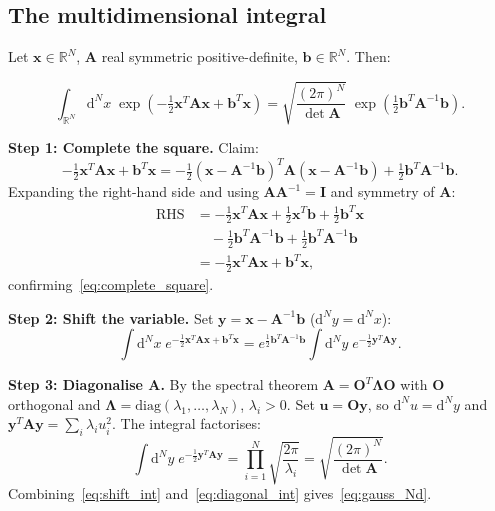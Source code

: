 \documentclass[justified,notoc]{tufte-handout}
\def\d{\mathrm{d}}
\renewcommand{\vec}[1]{\mathbf{#1}}
\begin{document}
\subsection{The multidimensional integral}

Let $\vec{x}\in\mathbb{R}^N$, $\mathbf{A}$ real symmetric positive-definite, $\vec{b}\in\mathbb{R}^N$. Then:
\begin{keyresult}
\begin{equation}
  \int_{\mathbb{R}^N}\!\d^N\!x\;\exp\!\left(-\tfrac{1}{2}\vec{x}^T\mathbf{A}\vec{x}+\vec{b}^T\vec{x}\right)
  =\sqrt{\frac{(2\pi)^N}{\det\mathbf{A}}}\;\exp\!\left(\tfrac{1}{2}\vec{b}^T\mathbf{A}^{-1}\vec{b}\right).
  \label{eq:gauss_Nd}
\end{equation}
\end{keyresult}

\textbf{Step 1: Complete the square.} Claim:
\begin{equation}
  -\tfrac{1}{2}\vec{x}^T\mathbf{A}\vec{x}+\vec{b}^T\vec{x}
  =-\tfrac{1}{2}(\vec{x}-\mathbf{A}^{-1}\vec{b})^T\mathbf{A}(\vec{x}-\mathbf{A}^{-1}\vec{b})
   +\tfrac{1}{2}\vec{b}^T\mathbf{A}^{-1}\vec{b}.
  \label{eq:complete_square}
\end{equation}
Expanding the right-hand side and using $\mathbf{A}\mathbf{A}^{-1}=\mathbf{I}$ and symmetry of $\mathbf{A}$:
\begin{align}
  \text{RHS}
  &=-\tfrac{1}{2}\vec{x}^T\mathbf{A}\vec{x}
    +\tfrac{1}{2}\vec{x}^T\vec{b}
    +\tfrac{1}{2}\vec{b}^T\vec{x}\nonumber\\
  &\quad
    -\tfrac{1}{2}\vec{b}^T\mathbf{A}^{-1}\vec{b}
    +\tfrac{1}{2}\vec{b}^T\mathbf{A}^{-1}\vec{b}\nonumber\\
  &=-\tfrac{1}{2}\vec{x}^T\mathbf{A}\vec{x}+\vec{b}^T\vec{x},
\end{align}
confirming~\eqref{eq:complete_square}.

\textbf{Step 2: Shift the variable.} Set $\vec{y}=\vec{x}-\mathbf{A}^{-1}\vec{b}$ ($\d^N y=\d^N x$):
\begin{equation}
  \int\d^N\!x\;e^{-\frac{1}{2}\vec{x}^T\mathbf{A}\vec{x}+\vec{b}^T\vec{x}}
  =e^{\frac{1}{2}\vec{b}^T\mathbf{A}^{-1}\vec{b}}\int\d^N\!y\;e^{-\frac{1}{2}\vec{y}^T\mathbf{A}\vec{y}}.
  \label{eq:shift_int}
\end{equation}

\textbf{Step 3: Diagonalise $\mathbf{A}$.} By the spectral theorem $\mathbf{A}=\mathbf{O}^T\boldsymbol{\Lambda}\mathbf{O}$ with $\mathbf{O}$ orthogonal and $\boldsymbol{\Lambda}=\mathrm{diag}(\lambda_1,\ldots,\lambda_N)$, $\lambda_i>0$. Set $\vec{u}=\mathbf{O}\vec{y}$, so $\d^N u=\d^N y$ and $\vec{y}^T\mathbf{A}\vec{y}=\sum_i\lambda_i u_i^2$. The integral factorises:
\begin{equation}
  \int\d^N\!y\;e^{-\frac{1}{2}\vec{y}^T\mathbf{A}\vec{y}}
  =\prod_{i=1}^N\sqrt{\frac{2\pi}{\lambda_i}}
  =\sqrt{\frac{(2\pi)^N}{\det\mathbf{A}}}.
  \label{eq:diagonal_int}
\end{equation}
Combining~\eqref{eq:shift_int} and~\eqref{eq:diagonal_int} gives~\eqref{eq:gauss_Nd}.
\end{document}
